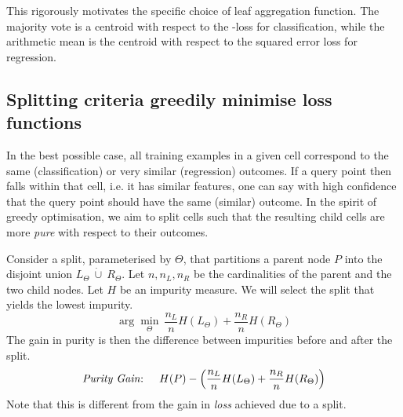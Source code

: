\documentclass[../main.tex]{subfiles}
\begin{document}
This rigorously motivates the specific choice of leaf aggregation function. The majority vote is a centroid with respect to the \zeroone-loss for classification, while the arithmetic mean is the centroid with respect to the squared error loss for regression.



\subsection{Splitting criteria greedily minimise loss functions}
\label{sec:splitting-criteria-greedily-minimise-loss-functions}

In the best possible case, all training examples in a given cell correspond to the same (classification) or very similar (regression) outcomes. If a query point then falls within that cell, i.e. it has similar features, one can say with high confidence that the query point should have the same (similar) outcome. In the spirit of greedy optimisation, we aim to split cells such that the resulting child cells are more \textit{pure} with respect to their outcomes. 




Consider a split, parameterised by $\Theta$, that partitions a parent node $P$ into the disjoint union $L_{\Theta} ~\dot{\cup}~R_{\Theta}$. Let $n, n_{L}, n_{R}$ be the cardinalities of the parent and the two child nodes. Let $H$ be an impurity measure. We will select the split that yields the lowest impurity.
$$
\arg \min_{\Theta} ~ \frac{n_{L}}{n} H(L_{\Theta}) + \frac{n_{R}}{n} H(R_{\Theta})
$$
The gain in purity is then the difference between impurities before and after the split.
\begin{align}
\text{\textit{Purity Gain}: } \hspace{1em}
H(P) - \left(  \frac{n_{L}}{n} H(L_{\Theta}) + \frac{n_{R}}{n}H(R_{\Theta}) \right)
\label{eq:purity-gain}
\end{align}
Note that this is different from the gain in \textit{loss} achieved due to a split. 
\end{document}
